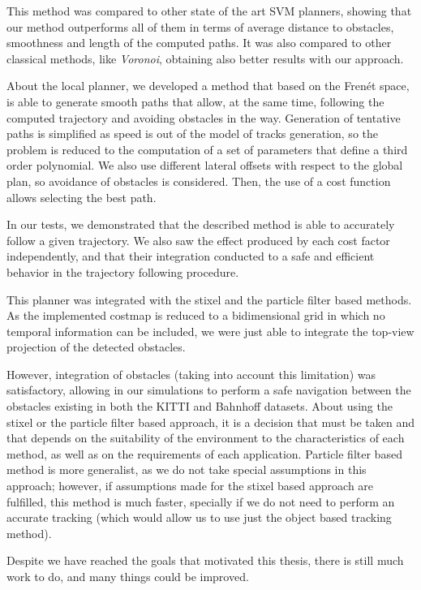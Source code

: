 This method was compared to other state of the art \ac{SVM} planners, showing that our method outperforms all of them in terms of average distance to obstacles, smoothness and length of the computed paths. It was also compared to other classical methods, like \emph{Voronoi}, obtaining also better results with our approach.

About the local planner, we developed a method that based on the Frenét space, is able to generate smooth paths that allow, at the same time, following the computed trajectory and avoiding obstacles in the way. Generation of tentative paths is simplified as speed is out of the model of tracks generation, so the problem is reduced to the computation of a set of parameters that define a third order polynomial. We also use different lateral offsets with respect to the global plan, so avoidance of obstacles is considered. Then, the use of a cost function allows selecting the best path.

In our tests, we demonstrated that the described method is able to accurately follow a given trajectory. We also saw the effect produced by each cost factor independently, and that their integration conducted to a safe and efficient behavior in the trajectory following procedure.

This planner was integrated with the stixel and the particle filter based methods. As the implemented costmap is reduced to a bidimensional grid in which no temporal information can be included, we were just able to integrate the top-view projection of the detected obstacles.

However, integration of obstacles (taking into account this limitation) was satisfactory, allowing in our simulations to perform a safe navigation between the obstacles existing in both the KITTI \citep{geiger2013vision} and Bahnhoff \citep{ess2009robust} datasets. About using the stixel or the particle filter based approach, it is a decision that must be taken and that depends on the suitability of the environment to the characteristics of each method, as well as on the requirements of each application. Particle filter based method is more generalist, as we do not take special assumptions in this approach; however, if assumptions made for the stixel based approach are fulfilled, this method is much faster, specially if we do not need to perform an accurate tracking (which would allow us to use just the object based tracking method).


Despite we have reached the goals that motivated this thesis, there is still much work to do, and many things could be improved. 

